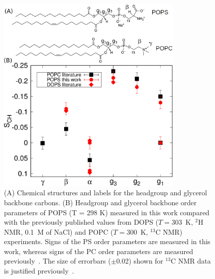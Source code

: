 \documentclass[journal=jpcbfk,manuscript=article]{achemso}
\newcommand{\todo}[1]{\textcolor{red}{#1}}
\begin{document}
\begin{figure}[!htb]
  \centering
  \includegraphics[width=9.0cm]{../Figs/PCPScomp.eps}
  \caption{\label{HGorderParameters}
    (A) Chemical structures and labels for the headgroup and glycerol backbone carbons.
    (B) Headgroup and glycerol backbone order parameters of POPS (T = 298 K) measured in this work compared
    with the previously published values from DOPS ($T=303$~K, $^2$H NMR, 0.1~M of NaCl) \cite{browning80} and 
    POPC  ($T=300$~K, $^{13}$C NMR) \cite{ferreira13} experiments. Signs of the PS order parameters
    are measured in this work, whereas signs of the PC order parameters are measured previously~\cite{ferreira16}.
    The size of errorbars ($\pm$0.02) shown for $^{13}$C NMR data is justified previously~\cite{botan15,ollila16}. 
  }
\end{figure}
\end{document}
